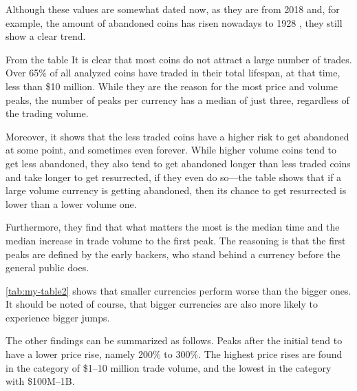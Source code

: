 \documentclass[11pt,a4paper,compsoc,conference]{IEEEtran}
\begin{document}
Although these values are somewhat dated now, as they are from 2018 and, for example, the amount of abandoned coins has risen nowadays to 1928 \citep{deadcoins}, they still show a clear trend. 

From the table It is clear that most coins do not attract a large number of trades. Over 65\% of all analyzed coins have traded in their total lifespan, at that time, less than \$10 million. While they are the reason for the most price and volume peaks, the number of peaks per currency has a median of just three, regardless of the trading volume. 

Moreover, it shows that the less traded coins have a higher risk to get abandoned at some point, and sometimes even forever. While higher volume coins tend to get less abandoned, they also tend to get abandoned longer than less traded coins and take longer to get resurrected, if they even do so---the table shows that if a large volume currency is getting abandoned, then its chance to get resurrected is lower than a lower volume one.

Furthermore, they find that what matters the most is the median time and the median increase in trade volume to the first peak. The reasoning is that the first peaks are defined by the early backers, who stand behind a currency before the general public does. 

\begin{table}[h]
\centering
{}

\caption{Median increases from launch to the first peak}
\label{tab:my-table2}
\end{table}
\autoref{tab:my-table2} shows that smaller currencies perform worse than the bigger ones. It should be noted of course, that bigger currencies are also more likely to experience bigger jumps.  

The other findings can be summarized as follows. Peaks after the initial tend to have a lower price rise, namely 200\% to 300\%. The highest price rises are found in the category of \$1--10 million trade volume, and the lowest in the category with \$100M--1B. 
\end{document}
